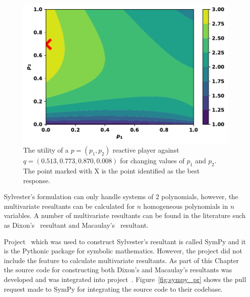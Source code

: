 \begin{figure}[!htbp]
    \centering
    \includegraphics[width=.6\linewidth]{src/chapters/05/reactive_best_response.pdf}
    \caption{The utility of a \(p=(p_1, p_2)\) reactive player against \(q =
    (0.513, 0.773, 0.870, 0.008)\) for changing values of \(p_1\) and \(p_2\).
    The point marked with X is the point identified as the best response.}
    \label{fig:reactive_example_utility}
\end{figure}

Sylvester's formulation can only handle systems of 2 polynomials, however, the
multivariate resultants can be calculated for \(n\) homogeneous polynomials in \(n\)
variables. A number of
multivariate resultants can be found in the literature such as
Dixon's~\cite{ResultantKapur} resultant and Macaulay's~\cite{Macaulay1902}
resultant.

Project~\cite{sympy} which was used to construct Sylvester's resultant is called
SymPy and it is the Pythonic package for symbolic mathematics. However, the
project did not include the feature to calculate multivariate resultants. As
part of this Chapter the source code for constructing both Dixon's and
Macaulay's resultants was developed and was integrated into
project~\cite{sympy}. Figure~\ref{fig:sympy_pr} shows the pull request made to
SymPy for integrating the source code to their codebase.

